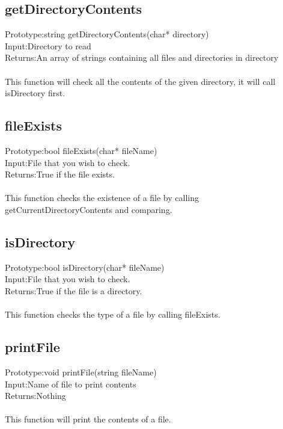 \documentclass[a4paper]{article}
\begin{document}
\subsection{getDirectoryContents}
Prototype:\hspace{0.2cm}string getDirectoryContents(char* directory)\\
Input:\hspace{0.88cm}Directory to read\\
Returns:\hspace{0.51cm}An array of strings containing all files and directories in directory\\\\
This function will check all the contents of the given directory, it will call isDirectory first.

\subsection{fileExists}
Prototype:\hspace{0.2cm}bool fileExists(char* fileName)\\
Input:\hspace{0.88cm}File that you wish to check.\\
Returns:\hspace{0.51cm}True if the file exists.\\\\
This function checks the existence of a file by calling getCurrentDirectoryContents and comparing.

\subsection{isDirectory}
Prototype:\hspace{0.2cm}bool isDirectory(char* fileName)\\
Input:\hspace{0.88cm}File that you wish to check.\\
Returns:\hspace{0.51cm}True if the file is a directory.\\\\
This function checks the type of a file by calling fileExists.

\subsection{printFile}
Prototype:\hspace{0.2cm}void printFile(string fileName)\\
Input:\hspace{0.88cm}Name of file to print contents\\
Returns:\hspace{0.51cm}Nothing\\\\
This function will print the contents of a file. 
\end{document}
